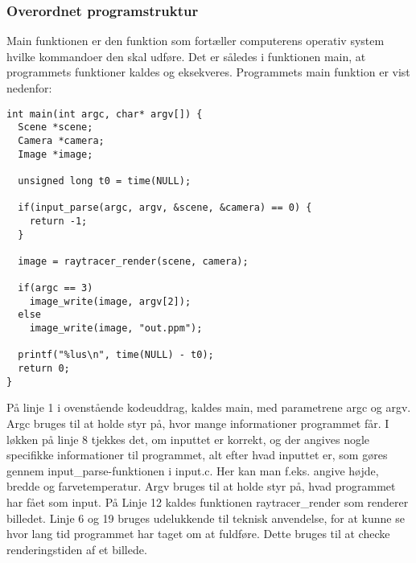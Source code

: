 \subsubsection{Overordnet programstruktur}
Main funktionen er den funktion som fortæller computerens operativ system hvilke kommandoer den skal udføre. Det er således i funktionen main, at programmets funktioner kaldes og eksekveres. Programmets main funktion er vist nedenfor:

\begin{lstlisting}[style=Cstyle, caption=Main]
int main(int argc, char* argv[]) {
  Scene *scene;
  Camera *camera;
  Image *image;

  unsigned long t0 = time(NULL);
  
  if(input_parse(argc, argv, &scene, &camera) == 0) {
    return -1;
  }
  
  image = raytracer_render(scene, camera);
  
  if(argc == 3)
    image_write(image, argv[2]);
  else
    image_write(image, "out.ppm");
  
  printf("%lus\n", time(NULL) - t0);
  return 0;
}
\end{lstlisting}

På linje 1 i ovenstående kodeuddrag, kaldes main, med parametrene argc og argv. Argc bruges til at holde styr på, hvor mange informationer programmet får. I løkken på linje 8 tjekkes det, om inputtet er korrekt, og der angives nogle specifikke informationer til programmet, alt efter hvad inputtet er, som gøres gennem input\_parse-funktionen i input.c. Her kan man f.eks. angive højde, bredde og farvetemperatur. Argv bruges til at holde styr på, hvad programmet har fået som input. På Linje 12 kaldes funktionen raytracer\_render som renderer billedet. Linje 6 og 19 bruges udelukkende til teknisk anvendelse, for at kunne se hvor lang tid programmet har taget om at fuldføre. Dette bruges til at checke renderingstiden af et billede.
